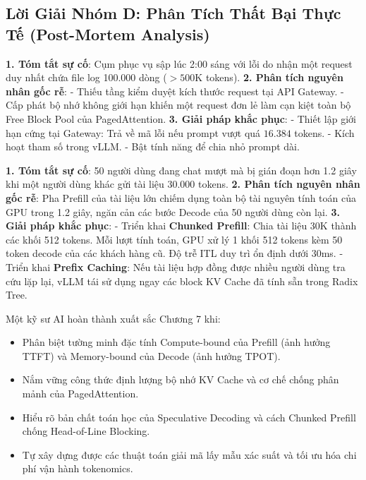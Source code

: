 \subsection{Lời Giải Nhóm D: Phân Tích Thất Bại Thực Tế (Post-Mortem Analysis)}

\begin{debugbox}
\textbf{1. Tóm tắt sự cố}: Cụm phục vụ sập lúc 2:00 sáng với lỗi  do nhận một request duy nhất chứa file log 100.000 dòng ($>500\text{K}$ tokens).
\textbf{2. Phân tích nguyên nhân gốc rễ}:
- Thiếu tầng kiểm duyệt kích thước request tại API Gateway.
- Cấp phát bộ nhớ không giới hạn khiến một request đơn lẻ làm cạn kiệt toàn bộ Free Block Pool của PagedAttention.
\textbf{3. Giải pháp khắc phục}:
- Thiết lập giới hạn cứng tại Gateway: Trả về mã lỗi  nếu prompt vượt quá $16.384$ tokens.
- Kích hoạt tham số  trong vLLM.
- Bật tính năng  để chia nhỏ prompt dài.
\end{debugbox}

\begin{debugbox}
\textbf{1. Tóm tắt sự cố}: 50 người dùng đang chat mượt mà bị gián đoạn hơn 1.2 giây khi một người dùng khác gửi tài liệu 30.000 tokens.
\textbf{2. Phân tích nguyên nhân gốc rễ}:
Pha Prefill của tài liệu lớn chiếm dụng toàn bộ tài nguyên tính toán của GPU trong 1.2 giây, ngăn cản các bước Decode của 50 người dùng còn lại.
\textbf{3. Giải pháp khắc phục}:
- Triển khai \textbf{Chunked Prefill}: Chia tài liệu 30K thành các khối 512 tokens. Mỗi lượt tính toán, GPU xử lý 1 khối 512 tokens kèm 50 token decode của các khách hàng cũ. Độ trễ ITL duy trì ổn định dưới 30ms.
- Triển khai \textbf{Prefix Caching}: Nếu tài liệu hợp đồng được nhiều người dùng tra cứu lặp lại, vLLM tái sử dụng ngay các block KV Cache đã tính sẵn trong Radix Tree.
\end{debugbox}

\begin{checkpointbox}
Một kỹ sư AI hoàn thành xuất sắc Chương 7 khi:
\begin{itemize}
  \item Phân biệt tường minh đặc tính Compute-bound của Prefill (ảnh hưởng TTFT) và Memory-bound của Decode (ảnh hưởng TPOT).
  \item Nắm vững công thức định lượng bộ nhớ KV Cache và cơ chế chống phân mảnh của PagedAttention.
  \item Hiểu rõ bản chất toán học của Speculative Decoding và cách Chunked Prefill chống Head-of-Line Blocking.
  \item Tự xây dựng được các thuật toán giải mã lấy mẫu xác suất và tối ưu hóa chi phí vận hành tokenomics.
\end{itemize}
\end{checkpointbox}
